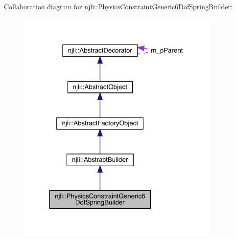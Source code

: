 Collaboration diagram for njli\+:\+:Physics\+Constraint\+Generic6\+Dof\+Spring\+Builder\+:\nopagebreak
\begin{figure}[H]
\begin{center}
\leavevmode
\includegraphics[width=284pt]{classnjli_1_1_physics_constraint_generic6_dof_spring_builder__coll__graph}
\end{center}
\end{figure}
